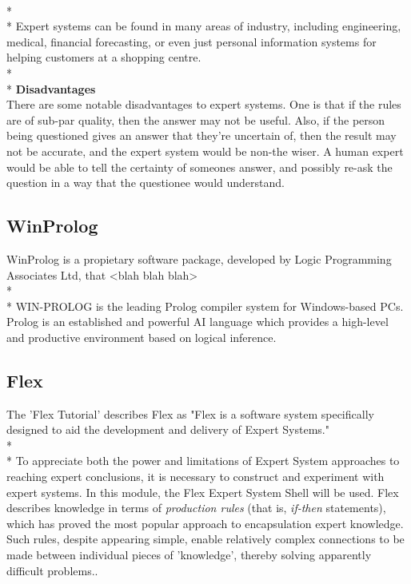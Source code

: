 \documentclass[12pt]{report}
\begin{document}
\\*
\\*
Expert systems can be found in many areas of industry, including engineering, medical, financial forecasting, or even just personal information systems for helping customers at a shopping centre.
\\*
\\*
\textbf{Disadvantages}\\
There are some notable disadvantages to expert systems.  One is that if the rules are of sub-par quality, then the answer may not be useful.  Also, if the person being questioned gives an answer that they're uncertain of, then the result may not be accurate, and the expert system would be non-the wiser.  A human expert would be able to tell the certainty of someones answer, and possibly re-ask the question in a way that the questionee would understand.

\subsection{WinProlog}\label{subsec:winprolog}
WinProlog is a propietary software package, developed by Logic Programming Associates Ltd, that <blah blah blah>
\\*
\\*
WIN-PROLOG is the leading Prolog compiler system for Windows-based PCs. Prolog is an established and powerful AI language which provides a high-level and productive environment based on logical inference.\citep{lpawinprolog}

\subsection{Flex}\label{subsec:flex}
The 'Flex Tutorial' describes Flex as "Flex is a software system specifically designed to aid the development and delivery of Expert Systems."
\\*
\\*
To appreciate both the power and limitations of Expert System approaches to reaching expert conclusions, it is necessary to construct and experiment with expert systems.  In this module, the Flex Expert System Shell will be used.  Flex describes knowledge in terms of \textit{production rules} (that is, \textit{if-then} statements), which has proved the most popular approach to encapsulation expert knowledge.  Such rules, despite appearing simple, enable relatively complex connections to be made between individual pieces of 'knowledge', thereby solving apparently difficult problems.\citep{flexsystems09}.
\end{document}
